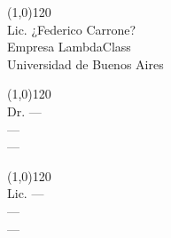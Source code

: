 \documentclass[a4paper,11pt]{article}
\begin{document}
 \vspace{1.1cm}


\begin{paracol}{3}

  \scriptsize

\noindent\line(1,0){120}\\
Lic. ¿Federico Carrone?\\
Empresa LambdaClass \\
Universidad de Buenos Aires

 \switchcolumn

\noindent\line(1,0){120}\\
Dr. --- \\
 --- \\
---

 \switchcolumn

\noindent\line(1,0){120}\\
Lic. --- \\
--- \\
---

 \end{paracol}
\end{document}
